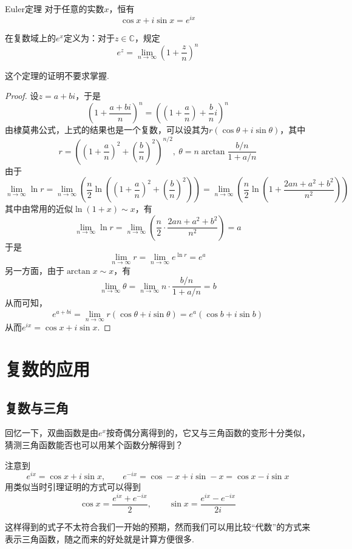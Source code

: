 \documentclass[lang=cn, zihao=5]{elegantbook}
\newcommand{\ssb}[1]{\left( #1 \right)}
\newcommand{\C}{\mathbb{C}}
\begin{document}
\begin{theorem}{Euler定理}
	对于任意的实数$x$，恒有$$\cos x + i \sin x = e^{i x}$$
\end{theorem}
\begin{remark}
	在复数域上的$e^x$定义为：对于$z \in \C$，规定$$e^z = \lim_{n\to \infty} \ssb{1+\frac{z}{n}}^n$$
\end{remark}
\begin{remark}
	这个定理的证明不要求掌握.
\end{remark}
\begin{proof}
	设$z=a+bi$，于是$$\ssb{1+\frac{a+bi}{n}}^n = \ssb{(1+\frac{a}{n}) + \frac{b}{n} i}^n$$
	由棣莫弗公式，上式的结果也是一个复数，可以设其为$r(\cos \theta + i \sin \theta)$，其中$$r=\ssb{(1+\frac{a}{n})^2 + (\frac{b}{n})^2}^{n/2},~\theta = n\arctan \frac{b/n}{1+a/n}$$
	由于$$\lim_{n\to \infty} \ln r = \lim_{n\to \infty} \ssb{ \frac{n}{2}\ln \ssb{(1+\frac{a}{n})^2 + (\frac{b}{n})^2}} = \lim_{n\to \infty} \ssb{ \frac{n}{2}\ln \ssb{ 1+\frac{2an+a^2+b^2}{n^2} }}$$
	其中由常用的近似$\ln (1+x) \sim x$，有$$\lim_{n\to \infty} \ln r = \lim_{n\to \infty} \ssb{ \frac{n}{2} \cdot \frac{2an+a^2+b^2}{n^2} } = a$$
	于是$$\lim_{n\to \infty} r = \lim_{n\to \infty} e^{\ln r} = e^a$$
	另一方面，由于$\arctan x \sim x$，有$$\lim_{n\to \infty} \theta = \lim_{n\to \infty} n \cdot \frac{b/n}{1+a/n} = b$$
	从而可知，$$e^{a+bi} = \lim_{n\to \infty} r(\cos \theta + i \sin \theta) = e^a(\cos b + i \sin b)$$
	从而$e^{ix}=\cos x + i \sin x$.
\end{proof}

\section{复数的应用}

\subsection{复数与三角}

回忆一下，双曲函数是由$e^x$按奇偶分离得到的，它又与三角函数的变形十分类似，猜测三角函数能否也可以用某个函数分解得到？

注意到$$e^{ix} = \cos x + i \sin x,\qquad e^{-ix} = \cos -x + i \sin -x = \cos x - i \sin x$$
用类似当时引理证明的方式可以得到$$\cos x = \frac{e^{ix}+e^{-ix}}{2},\qquad \sin x = \frac{e^{ix} - e^{-ix}}{2i}$$

这样得到的式子不太符合我们一开始的预期，然而我们可以用比较“代数”的方式来表示三角函数，随之而来的好处就是计算方便很多.
\end{document}
